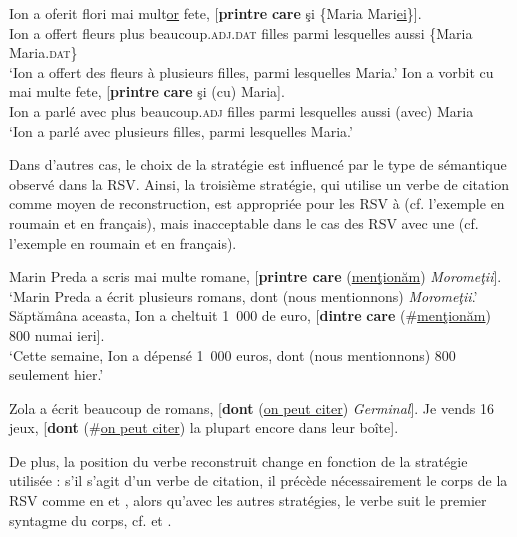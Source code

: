 \ea \label{ch3:ex97}
\ea 
\gll Ion  a  oferit  flori  mai  mult\uline{or} fete,  [\textbf{printre} \textbf{care}  şi   \{Maria {\textbar} Mari\uline{ei}\}]. \label{ch3:ex97a}\\
Ion  a  offert  fleurs  plus  beaucoup.\textsc{adj.dat}  filles  parmi  lesquelles  aussi \{Maria {\textbar} Maria.\textsc{dat}\} \\
\glt ‘Ion a offert des fleurs à plusieurs filles, parmi lesquelles Maria.’ 
\ex 
\gll Ion  a  vorbit  cu  mai  multe  fete,  [\textbf{printre} \textbf{care}  şi  (cu) Maria]. \label{ch3:ex97b}\\
Ion  a  parlé  avec  plus  beaucoup.\textsc{adj}  filles  parmi  lesquelles  aussi  (avec) Maria \\
\glt ‘Ion a parlé avec plusieurs filles, parmi lesquelles Maria.’
\z 
\z

Dans d’autres cas, le choix de la stratégie est influencé par le type de sémantique observé dans la RSV. Ainsi, la troisième stratégie, qui utilise un verbe de citation comme moyen de reconstruction, est appropriée pour les RSV à  (cf. l’exemple  en roumain et  en français), mais inacceptable dans le cas des RSV avec une  (cf. l’exemple  en roumain et  en français).

\ea \label{ch3:ex98}
\ea 
Marin Preda a scris mai multe romane, [\textbf{printre care} (\uline{menţionăm}) \textit{Moromeţii}]. \label{ch3:ex98a}\\
\glt ‘Marin Preda a écrit plusieurs romans, dont (nous mentionnons) \textit{Moromeţii}.’
\ex 
Săptămâna aceasta, Ion a cheltuit 1~000 de euro, [\textbf{dintre} \textbf{care} (\#\uline{menţionăm}) 800 numai ieri]. \label{ch3:ex98b}\\
\glt ‘Cette semaine, Ion a dépensé 1~000 euros, dont (nous mentionnons) 800 seulement hier.’  
\z 
\z 

\ea \label{ch3:ex99} 
\ea 
Zola a écrit beaucoup de romans, [\textbf{dont} (\uline{on peut citer}) \textit{Germinal}]. \label{ch3:ex99a} 
\ex
Je vends 16 jeux, [\textbf{dont} (\#\uline{on peut citer}) la plupart encore dans leur boîte]. \label{ch3:ex99b}
\z 
\z

De plus, la position du verbe reconstruit change en fonction de la stratégie utilisée : s’il s’agit d’un verbe de citation, il précède nécessairement le corps de la RSV comme en  et , alors qu’avec les autres stratégies, le verbe suit le premier syntagme du corps, cf.  et .

